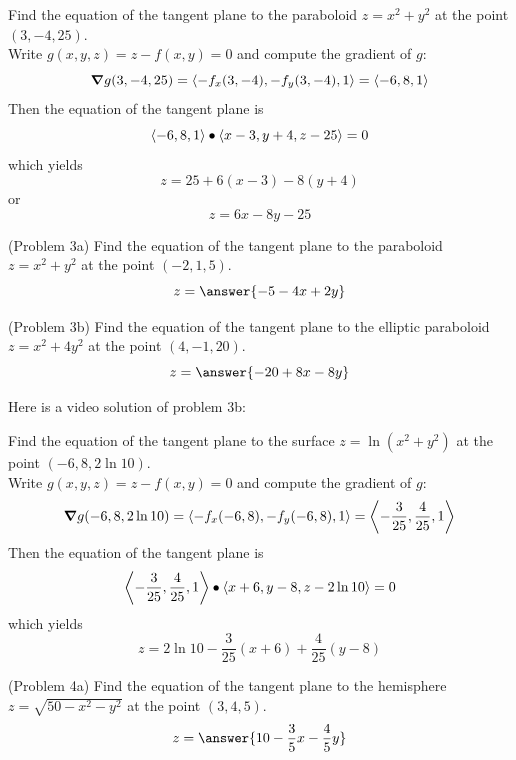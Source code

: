 \documentclass[handout]{ximera}
\begin{document}
\begin{example}[Example 3]
Find the equation of the tangent plane to the paraboloid $z = x^2 + y^2$ at 
the point $(3, -4, 25)$.\\
Write $g(x, y, z) = z - f(x,y) = 0$ and compute the gradient of $g$:
\[
\boldsymbol\nabla g(3, -4, 25) = \left\langle -f_x(3, -4), -f_y(3, -4), 1\right\rangle = \left\langle -6, 8, 1\right\rangle
\]
Then the equation of the tangent plane is
\[
\left\langle -6, 8, 1\right\rangle \bullet \left\langle x-3, y+4, z-25\right\rangle = 0
\]
which yields
\[
z = 25 + 6(x-3) - 8(y+4)
\]
or
\[
z = 6x - 8y - 25
\]
\end{example}

\begin{center}
\end{center}

\begin{problem}(Problem 3a)
Find the equation of the tangent plane to the paraboloid $z = x^2 + y^2$ at 
the point $(-2, 1, 5)$.\\
\[
z = \answer{-5-4x+2y}
\]

\end{problem}


\begin{problem}(Problem 3b)
Find the equation of the tangent plane to the elliptic paraboloid $z = x^2 + 4y^2$ at 
the point $(4, -1, 20)$.\\
\[
z = \answer{-20 + 8x -8y}
\]
\end{problem}

Here is a video solution of problem 3b:\\
\begin{foldable}
\end{foldable}


\begin{example}[Example 4]
Find the equation of the tangent plane to the surface $z = \ln(x^2 + y^2)$ at 
the point $(-6, 8, 2\ln 10)$.\\
Write $g(x, y, z) = z - f(x,y) = 0$ and compute the gradient of $g$:
\[
\boldsymbol\nabla g(-6, 8, 2\ln 10) = \left\langle -f_x(-6, 8), -f_y(-6, 8), 1\right\rangle = \left\langle -\frac{3}{25}, \frac{4}{25}, 1\right\rangle
\]
Then the equation of the tangent plane is
\[
\left\langle -\frac{3}{25}, \frac{4}{25}, 1\right\rangle \bullet \left\langle x+6, y-8, z-2\ln 10\right\rangle = 0
\]
which yields
\[
z = 2\ln 10 - \frac{3}{25}(x+6) +\frac{4}{25}(y-8)
\]
\end{example}

\begin{problem}(Problem 4a)
Find the equation of the tangent plane to the hemisphere $z = \sqrt{50 -x^2 - y^2}$ at 
the point $(3, 4, 5)$.\\
\[
z = \answer{10-\frac35 x - \frac45 y}
\]

\end{problem}
\end{document}
